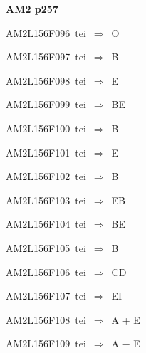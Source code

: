 \par\vfill\eject
{\bf\hfill AM2 p257\hfill\hbox{}}\par\bigskip
{\sixrm AM2L156F096\ {\sixit tei}\ }$\Rightarrow$\ O\par\smallskip
{\sixrm AM2L156F097\ {\sixit tei}\ }$\Rightarrow$\ B\par\smallskip
{\sixrm AM2L156F098\ {\sixit tei}\ }$\Rightarrow$\ E\par\smallskip
{\sixrm AM2L156F099\ {\sixit tei}\ }$\Rightarrow$\ BE\par\smallskip
{\sixrm AM2L156F100\ {\sixit tei}\ }$\Rightarrow$\ {\tenit B}\par\smallskip
{\sixrm AM2L156F101\ {\sixit tei}\ }$\Rightarrow$\ {\tenit E}\par\smallskip
{\sixrm AM2L156F102\ {\sixit tei}\ }$\Rightarrow$\ {\tenit B}\par\smallskip
{\sixrm AM2L156F103\ {\sixit tei}\ }$\Rightarrow$\ EB\par\smallskip
{\sixrm AM2L156F104\ {\sixit tei}\ }$\Rightarrow$\ BE\par\smallskip
{\sixrm AM2L156F105\ {\sixit tei}\ }$\Rightarrow$\ B\par\smallskip
{\sixrm AM2L156F106\ {\sixit tei}\ }$\Rightarrow$\ CD\par\smallskip
{\sixrm AM2L156F107\ {\sixit tei}\ }$\Rightarrow$\ EI\par\smallskip
{\sixrm AM2L156F108\ {\sixit tei}\ }$\Rightarrow$\ {\tenit A} + {\tenit E}\par\smallskip
{\sixrm AM2L156F109\ {\sixit tei}\ }$\Rightarrow$\ {\tenit A} − {\tenit E}\par\smallskip

